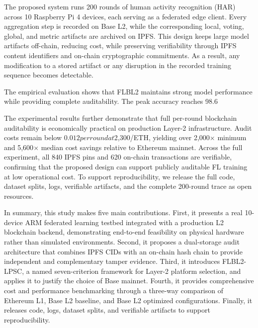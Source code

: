 \documentclass{llncs}
\begin{document}
The proposed system runs 200 rounds of human activity recognition (HAR) across 10 Raspberry Pi 4 devices, each serving as a federated edge client. Every aggregation step is recorded on Base L2, while the corresponding local, voting, global, and metric artifacts are archived on IPFS. This design keeps large model artifacts off-chain, reducing cost, while preserving verifiability through IPFS content identifiers and on-chain cryptographic commitments. As a result, any modification to a stored artifact or any disruption in the recorded training sequence becomes detectable.

The empirical evaluation shows that FLBL2 maintains strong model performance while providing complete auditability. The peak accuracy reaches 98.6%

The experimental results further demonstrate that full per-round blockchain auditability is economically practical on production Layer-2 infrastructure. Audit costs remain below $0.012 per round at $2,300/ETH, yielding over 2,000$\times$ minimum and 5,600$\times$ median cost savings relative to Ethereum mainnet. Across the full experiment, all 840 IPFS pins and 620 on-chain transactions are verifiable, confirming that the proposed design can support publicly auditable FL training at low operational cost. To support reproducibility, we release the full code, dataset splits, logs, verifiable artifacts, and the complete 200-round trace as open resources.

In summary, this study makes five main contributions. First, it presents a real 10-device ARM federated learning testbed integrated with a production L2 blockchain backend, demonstrating end-to-end feasibility on physical hardware rather than simulated environments. Second, it proposes a dual-storage audit architecture that combines IPFS CIDs with an on-chain hash chain to provide independent and complementary tamper evidence. Third, it introduces FLBL2-LPSC, a named seven-criterion framework for Layer-2 platform selection, and applies it to justify the choice of Base mainnet. Fourth, it provides comprehensive cost and performance benchmarking through a three-way comparison of Ethereum L1, Base L2 baseline, and Base L2 optimized configurations. Finally, it releases code, logs, dataset splits, and verifiable artifacts to support reproducibility.
\end{document}

